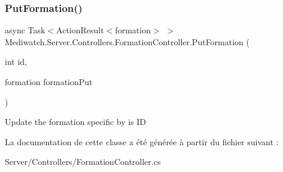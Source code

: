 \subsubsection{\texorpdfstring{Put\+Formation()}{PutFormation()}}
{\footnotesize\ttfamily async Task$<$Action\+Result$<$formation$>$ $>$ Mediwatch.\+Server.\+Controllers.\+Formation\+Controller.\+Put\+Formation (\begin{DoxyParamCaption}\item[{int}]{id,  }\item[{formation}]{formation\+Put }\end{DoxyParamCaption})\hspace{0.3cm}{\ttfamily [inline]}}

Update the formation specific by is ID 

La documentation de cette classe a été générée à partir du fichier suivant \+:\begin{DoxyCompactItemize}
\item 
Server/\+Controllers/Formation\+Controller.\+cs\end{DoxyCompactItemize}
